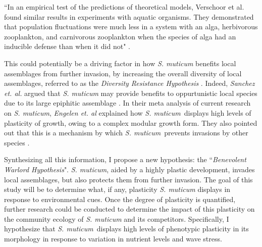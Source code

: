 \documentclass[12pt]{extarticle}
\newcommand\x{\textit{S. muticum}}
\begin{document}
\begin{displayquote} ``In an empirical test of the predictions of theoretical models, Verschoor et al. \cite{verschoor2004inducible} found similar results in experiments with aquatic organisms. They demonstrated that population fluctuations were much less in a system with an alga, herbivorous zooplankton, and carnivorous zooplankton when the species of alga had an inducible defense than when it did not" \cite{Miner2005}. \end{displayquote}
This could potentially be a driving factor in how \textit{S. muticum} benefits local assemblages from further invasion, by increasing the overall diversity of local assemblages, referred to as the \textit{Diversity Resistance Hypothesis} \cite{Incera2009}. Indeed, \textit{Sanchez et. al.} argued that \textit{S. muticum} may provide benefits to oppurtunistic local species due to its large epiphitic assemblage \cite{Sanchez2005}. In their meta analysis of current research on \textit{S. muticum}, \textit{Engelen et. al} explained how \x\ displays high levels of plasticity of growth, owing to a complex modular growth form. They also pointed out that this is a mechanism by which \x\ prevents invasions by other species \cite{Engelen2015}.


Synthesizing all this information, I propose a new hypothesis: the ``\textit{Benevolent Warlord Hypothesis}". \textit{S. muticum}, aided by a highly plastic development, invades local assemblages, but also protects them from further invasion. The goal of this study will be to determine what, if any, plasticity \textit{S. muticum} displays in response to environmental cues. Once the degree of plasticity is quantified, further research could be conducted to determine the impact of this plasticity on the community ecology of \textit{S. muticum} and its competitors. Specifically, I hypothesize that \x\ displays high levels of phenotypic plasticity in its morphology in response to variation in nutrient levels and wave stress.


\end{document}
